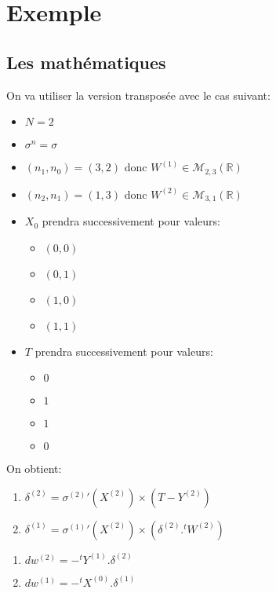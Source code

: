 \documentclass[11pt]{article}
\begin{document}
{\section{Exemple}
\label{sec-4}

\subsection{Les mathématiques}
\label{sec-4-1}

On va utiliser la version transposée avec le cas suivant:
\begin{itemize}
\item $N=2$
\item $\sigma^{n}=\sigma$
\item $(n_{1}, n_{0})=(3,2)$ donc $W^{(1)}\in\mathcal{M}_{2,3}(\mathbb{R})$
\item $(n_{2}, n_{1})=(1,3)$ donc $W^{(2)}\in\mathcal{M}_{3,1}(\mathbb{R})$
\item $X_{0}$ prendra successivement pour valeurs:
\begin{itemize}
\item $(0,0)$
\item $(0,1)$
\item $(1,0)$
\item $(1,1)$
\end{itemize}
\item $T$ prendra successivement pour valeurs:
\begin{itemize}
\item $0$
\item $1$
\item $1$
\item $0$
\end{itemize}
\end{itemize}

On obtient:

\begin{enumerate}
\item $\delta^{(2)}=\sigma^{(2)}'(X^{(2)})\times(T-Y^{(2)})$
\item $\delta^{(1)}=\sigma^{(1)}'(X^{(2)})\times (\delta^{(2)}.^{t}W^{(2)})$
\end{enumerate}


\begin{enumerate}
\item $dw^{(2)}=-^{t}Y^{(1)}.\delta^{(2)}$
\item $dw^{(1)}=-^{t}X^{(0)}.\delta^{(1)}$
\end{enumerate}


}
\end{document}
